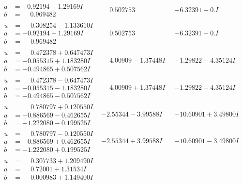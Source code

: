 \documentclass[1p]{elsarticle_modified}
\theoremstyle{definition}
\begin{document}
$$\begin{array}{c|c|c}
\begin{aligned}
a &= -0.92194 - 1.29169 I \\
b &= \phantom{-}0.969482\phantom{ +0.000000I}\end{aligned}
 & \phantom{-}0.502753\phantom{ +0.000000I} & -6.32391 + 0. I\phantom{ +0.000000I} \\ \hline\begin{aligned}
u &= \phantom{-}0.308254 - 1.133610 I \\
a &= -0.92194 + 1.29169 I \\
b &= \phantom{-}0.969482\phantom{ +0.000000I}\end{aligned}
 & \phantom{-}0.502753\phantom{ +0.000000I} & -6.32391 + 0. I\phantom{ +0.000000I} \\ \hline\begin{aligned}
u &= \phantom{-}0.472378 + 0.647473 I \\
a &= -0.055315 + 1.183280 I \\
b &= -0.494865 + 0.507562 I\end{aligned}
 & \phantom{-}4.00909 - 1.37448 I & -1.29822 + 4.35124 I \\ \hline\begin{aligned}
u &= \phantom{-}0.472378 - 0.647473 I \\
a &= -0.055315 - 1.183280 I \\
b &= -0.494865 - 0.507562 I\end{aligned}
 & \phantom{-}4.00909 + 1.37448 I & -1.29822 - 4.35124 I \\ \hline\begin{aligned}
u &= \phantom{-}0.780797 + 0.120550 I \\
a &= -0.886569 - 0.462655 I \\
b &= -1.222080 - 0.199525 I\end{aligned}
 & -2.55344 - 3.99588 I & -10.60901 + 3.49800 I \\ \hline\begin{aligned}
u &= \phantom{-}0.780797 - 0.120550 I \\
a &= -0.886569 + 0.462655 I \\
b &= -1.222080 + 0.199525 I\end{aligned}
 & -2.55344 + 3.99588 I & -10.60901 - 3.49800 I \\ \hline\begin{aligned}
u &= \phantom{-}0.307733 + 1.209490 I \\
a &= \phantom{-}0.72001 + 1.31534 I \\
b &= \phantom{-}0.000983 + 1.149400 I\end{aligned}

\end{array}$$
\end{document}
